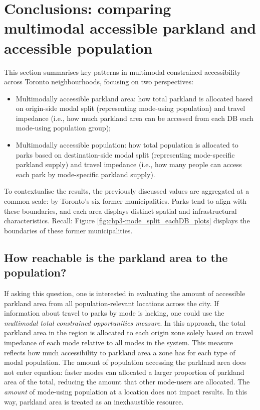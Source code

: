 \documentclass[
11pt, %
oneside, %
english, %
singlespacing, %
]{macthesis} %
\def\tightlist{}
\begin{document}
\section{Conclusions: comparing multimodal accessible parkland and accessible population}\label{conclusions-comparing-multimodal-accessible-parkland-and-accessible-population}

This section summarises key patterns in multimodal constrained accessibility across Toronto neighbourhoods, focusing on two perspectives:

\begin{itemize}
\tightlist
\item
  Multimodally accessible parkland area: how total parkland is allocated based on origin-side modal split (representing mode-using population) and travel impedance (i.e., how much parkland area can be accessed from each DB each mode-using population group);
\item
  Multimodally accessible population: how total population is allocated to parks based on destination-side modal split (representing mode-specific parkland supply) and travel impedance (i.e., how many people can access each park by mode-specific parkland supply).
\end{itemize}

To contextualise the results, the previously discussed values are aggregated at a common scale: by Toronto's six former municipalities. Parks tend to align with these boundaries, and each area displays distinct spatial and infrastructural characteristics. Recall: Figure \ref{fig:chp3-mode_split_eachDB_plots} displays the boundaries of these former municipalities.

\subsection{\texorpdfstring{\textbf{How reachable is the parkland area to the population?}}{How reachable is the parkland area to the population?}}\label{how-reachable-is-the-parkland-area-to-the-population}

If asking this question, one is interested in evaluating the amount of accessible parkland area from all population-relevant locations across the city. If information about travel to parks by mode is lacking, one could use the \emph{multimodal total constrained opportunities measure}. In this approach, the total parkland area in the region is allocated to each origin zone solely based on travel impedance of each mode relative to all modes in the system. This measure reflects how much accessibility to parkland area a zone has for each type of modal population. The amount of population accessing the parkland area does not enter equation: faster modes can allocated a larger proportion of parkland area of the total, reducing the amount that other mode-users are allocated. The \emph{amount} of mode-using population at a location does not impact results. In this way, parkland area is treated as an inexhaustible resource.
\end{document}
